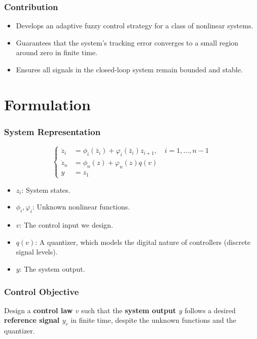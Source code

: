 \documentclass[18p]{beamer}
\begin{document}
\begin{frame}
	\frametitle{Contribution}
	\begin{itemize}
	\item Develops an adaptive fuzzy control strategy for a class of nonlinear systems.
	\item Guarantees that the system's tracking error converges to a small region around zero in finite time.
	\item Ensures all signals in the closed-loop system remain bounded and stable.
\end{itemize}
\end{frame}

\section{Formulation}
\begin{frame}
	\frametitle{System Representation}
\[
\left\{
\begin{aligned}
	\dot{z}_i &= \phi_i(\bar{z}_i) + \varphi_i(\bar{z}_i) z_{i+1}, \quad i = 1, \ldots, n-1 \\
	\dot{z}_n &= \phi_n(z) + \varphi_n(z) q(v) \\
	y &= z_1
\end{aligned}
\right.
\]

\begin{itemize}
	\item $z_i$: System states.
	\item $\phi_i, \varphi_i$: Unknown nonlinear functions.
	\item $v$: The control input we design.
	\item $q(v)$: A quantizer, which models the digital nature of controllers (discrete signal levels).
	\item $y$: The system output.
\end{itemize}
\end{frame}


\begin{frame}
	\frametitle{Control Objective}
	Design a \textbf{control law $v$} such that the \textbf{system output $y$} follows a desired \textbf{reference signal $y_r$} in finite time, despite the unknown functions and the quantizer.
\end{frame}


\end{document}
